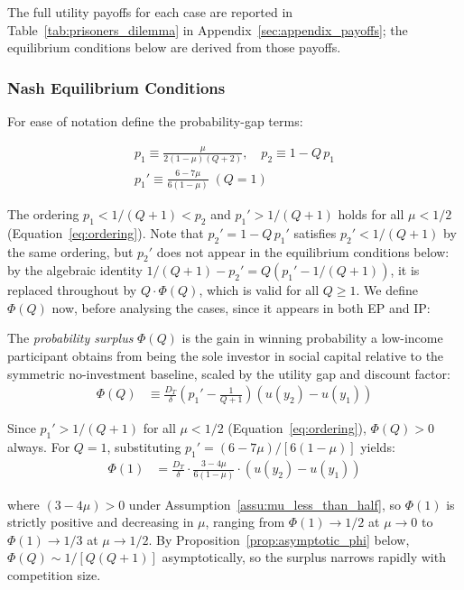 \documentclass[
    oneside,
    fontsize=10pt,leqno]{article}
\begin{document}
The full utility payoffs for each case are reported in
Table~\ref{tab:prisoners_dilemma} in Appendix~\ref{sec:appendix_payoffs};
the equilibrium conditions below are derived from those payoffs.

\subsubsection{\label{subsec:Nash-Equilibrium-Conditions}Nash Equilibrium Conditions}

For ease of notation define the probability-gap terms:

\begin{gather}
p_{1}\equiv\frac{\mu}{2(1-\mu)(Q+2)},\quad p_{2}\equiv1-Q\,p_{1}\nonumber\\
p_{1}'\equiv\frac{6-7\mu}{6(1-\mu)}\;(Q=1)\label{eq:probabilities}
\end{gather}

The ordering $p_{1}<1/(Q+1)<p_{2}$ and $p_{1}'>1/(Q+1)$
holds for all $\mu<1/2$ (Equation~\ref{eq:ordering}). Note that
$p_{2}'=1-Q\,p_{1}'$ satisfies $p_{2}'<1/(Q+1)$ by the same
ordering, but $p_{2}'$ does not appear in the equilibrium conditions
below: by the algebraic identity $1/(Q+1)-p_{2}'=Q(p_{1}'-1/(Q+1))$,
it is replaced throughout by $Q\cdot\Phi(Q)$, which is valid for all
$Q\geq1$. We define $\Phi(Q)$ now, before analysing the cases, since
it appears in both EP and IP:

\medskip
\noindent The \emph{probability surplus} $\Phi(Q)$ is the gain in
winning probability a low-income participant obtains from being the
sole investor in social capital relative to the symmetric
no-investment baseline, scaled by the utility gap and discount
factor:
\begin{align}
\Phi(Q) & \equiv\frac{D_{T}}{\delta}\left(p_{1}'-\frac{1}{Q+1}\right)(u(y_{2})-u(y_{1}))\label{eq:Phi_def}
\end{align}

\noindent Since $p_{1}'>1/(Q+1)$ for all $\mu<1/2$
(Equation~\ref{eq:ordering}), $\Phi(Q)>0$ always. For $Q=1$,
substituting $p_{1}'=(6-7\mu)/[6(1-\mu)]$ yields:
\begin{align}
\Phi(1) & =\frac{D_{T}}{\delta}\cdot\frac{3-4\mu}{6(1-\mu)}\cdot(u(y_{2})-u(y_{1}))\label{eq:Phi_Q1}
\end{align}

\noindent where $(3-4\mu)>0$ under Assumption~\ref{assu:mu_less_than_half},
so $\Phi(1)$ is strictly positive and decreasing in $\mu$, ranging
from $\Phi(1)\to1/2$ at $\mu\to0$ to $\Phi(1)\to1/3$ at $\mu\to1/2$.
By Proposition~\ref{prop:asymptotic_phi} below, $\Phi(Q)\sim1/[Q(Q+1)]$
asymptotically, so the surplus narrows rapidly with competition size.
\end{document}
